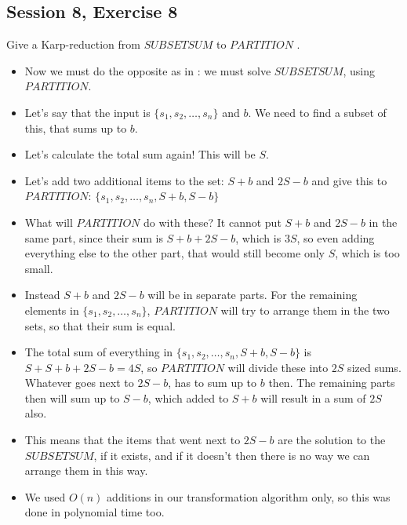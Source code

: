 \subsection {Session 8, Exercise 8}
\label{8f8}



Give a Karp-reduction from $SUBSETSUM$ to $PARTITION$ .


\begin{itemize}
    \item Now we must do the opposite as in : we must solve $SUBSETSUM$, using $PARTITION$.
    \item Let's say that the input is $\{s_1, s_2, \dots{}, s_n\}$ and $b$. We need to find a subset of this, that sums up to $b$.
    \item Let's calculate the total sum again! This will be $S$.
    \item Let's add two additional items to the set: $S+b$ and $2S-b$ and give this to $PARTITION$: $\{s_1, s_2, \dots{}, s_n, S+b, S-b\}$
    \item What will $PARTITION$ do with these? It cannot put $S+b$ and $2S-b$ in the same part, since their sum is $S+b+2S-b$, which is $3S$, so even adding everything else to the other part, that would still become only $S$, which is too small.
    \item Instead $S+b$ and $2S-b$ will be in separate parts. For the remaining elements in $\{s_1, s_2, \dots{}, s_n\}$, $PARTITION$ will try to arrange them in the two sets, so that their sum is equal.
    \item The total sum of everything in $\{s_1, s_2, \dots{}, s_n, S+b, S-b\}$ is $S + S + b + 2S - b = 4S$, so $PARTITION$ will divide these into $2S$ sized sums. Whatever goes next to $2S-b$, has to sum up to $b$ then. The remaining parts then will sum up to $S-b$, which added to $S+b$ will result in a sum of $2S$ also.
    \item This means that the items that went next to $2S-b$ are the solution to the $SUBSETSUM$, if it exists, and if it doesn't then there is no way we can arrange them in this way.
    \item We used $O(n)$ additions in our transformation algorithm only, so this was done in polynomial time too.
\end{itemize}


